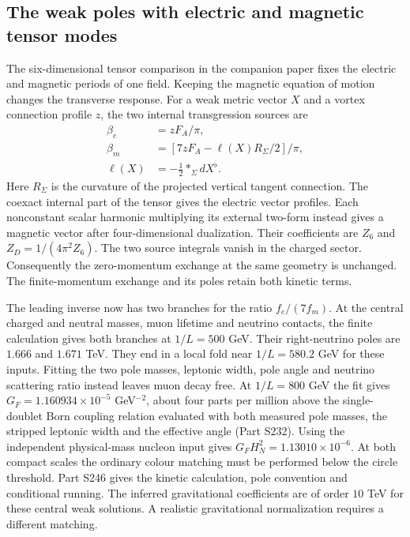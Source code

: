 \documentclass[aps,prd,reprint,onecolumn,nofootinbib,amsmath,amssymb]{revtex4-2}
\begin{document}
\subsection{The weak poles with electric and magnetic tensor modes}
The six-dimensional tensor comparison in the companion paper fixes the electric and magnetic periods of one field. Keeping the magnetic equation of motion changes the transverse response. For a weak metric vector $X$ and a vortex connection profile $z$, the two internal transgression sources are
\begin{equation}
 \begin{aligned}
 \beta_e &= zF_A/\pi,\\
 \beta_m &= [7zF_A-\ell(X)R_\Sigma/2]/\pi,\\
 \ell(X)&=-\tfrac12*_\Sigma dX^\flat .
 \end{aligned}
\end{equation}
Here $R_\Sigma$ is the curvature of the projected vertical tangent connection. The coexact internal part of the tensor gives the electric vector profiles. Each nonconstant scalar harmonic multiplying its external two-form instead gives a magnetic vector after four-dimensional dualization. Their coefficients are $Z_6$ and $Z_D=1/(4\pi^2Z_6)$. The two source integrals vanish in the charged sector. Consequently the zero-momentum exchange at the same geometry is unchanged. The finite-momentum exchange and its poles retain both kinetic terms.

The leading inverse now has two branches for the ratio $f_e/(7f_m)$. At the central charged and neutral masses, muon lifetime and neutrino contacts, the finite calculation gives both branches at $1/L=500$ GeV. Their right-neutrino poles are $1.666$ and $1.671$ TeV. They end in a local fold near $1/L=580.2$ GeV for these inputs. Fitting the two pole masses, leptonic width, pole angle and neutrino scattering ratio instead leaves muon decay free. At $1/L=800$ GeV the fit gives $G_F=1.160934\times10^{-5}$ GeV$^{-2}$, about four parts per million above the single-doublet Born coupling relation evaluated with both measured pole masses, the stripped leptonic width and the effective angle (Part S232). Using the independent physical-mass nucleon input gives $G_FH_N^2=1.13010\times10^{-6}$. At both compact scales the ordinary colour matching must be performed below the circle threshold. Part S246 gives the kinetic calculation, pole convention and conditional running. The inferred gravitational coefficients are of order $10$ TeV for these central weak solutions. A realistic gravitational normalization requires a different matching.
\end{document}
